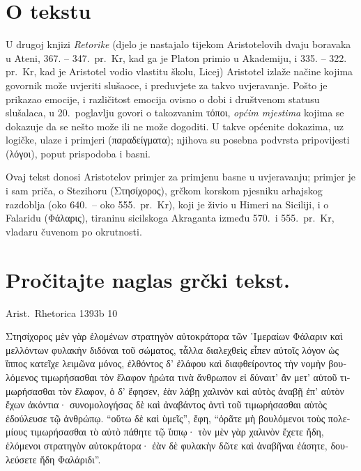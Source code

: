 


\section*{O tekstu}

U drugoj knjizi \textit{Retorike} (djelo je nastajalo tijekom Aristotelovih dvaju boravaka u Ateni, 367. – 347.\ pr.~Kr, kad ga je Platon primio u Akademiju, i 335. – 322. pr.~Kr, kad je Aristotel vodio vlastitu školu, Licej) Aristotel izlaže načine kojima govornik može uvjeriti slušaoce, i preduvjete za takvo uvjeravanje. Pošto je prikazao emocije, i različitost emocija ovisno o dobi i društvenom statusu slušalaca, u 20.\ poglavlju govori o takozvanim τόποι, \textit{općim mjestima} kojima se dokazuje da se nešto može ili ne može dogoditi. U takve općenite dokazima, uz logičke, ulaze i primjeri \textgreek[variant=ancient]{(παραδείγματα);} njihova su posebna podvrsta pripovijesti \textgreek[variant=ancient]{(λόγοι),} poput prispodoba i basni. 

Ovaj tekst donosi Aristotelov primjer za primjenu basne u uvjeravanju; primjer je i sam priča, o Stezihoru \textgreek[variant=ancient]{(Στησίχορος),} grčkom korskom pjesniku arhajskog razdoblja (oko 640.\ – oko 555.\ pr.~Kr), koji je živio u Himeri na Siciliji, i o Falaridu \textgreek[variant=ancient]{(Φάλαρις),} tiraninu sicilskoga Akraganta između 570.\ i 555.\ pr.~Kr, vladaru čuvenom po okrutnosti.

\newpage

\section*{Pročitajte naglas grčki tekst.}

Arist.\ Rhetorica 1393b 10

\medskip

{\large
\begin{greek}
\noindent Στησίχορος μὲν γὰρ ἑλομένων στρατηγὸν αὐτοκράτορα τῶν ῾Ιμεραίων Φάλαριν καὶ μελλόντων φυλακὴν διδόναι τοῦ σώματος, τἆλλα διαλεχθεὶς εἶπεν αὐτοῖς λόγον ὡς ἵππος κατεῖχε λειμῶνα μόνος, ἐλθόντος δ' ἐλάφου καὶ διαφθείροντος τὴν νομὴν βουλόμενος τιμωρήσασθαι τὸν ἔλαφον ἠρώτα τινὰ ἄνθρωπον εἰ δύναιτ' ἂν μετ' αὐτοῦ τιμωρήσασθαι τὸν ἔλαφον, ὁ δ' ἔφησεν, ἐὰν λάβῃ χαλινὸν καὶ αὐτὸς ἀναβῇ ἐπ' αὐτὸν ἔχων ἀκόντια· συνομολογήσας δὲ καὶ ἀναβάντος ἀντὶ τοῦ τιμωρήσασθαι αὐτὸς ἐδούλευσε τῷ ἀνθρώπῳ. ``οὕτω δὲ καὶ ὑμεῖς'', ἔφη, ``ὁρᾶτε μὴ βουλόμενοι τοὺς πολεμίους τιμωρήσασθαι τὸ αὐτὸ πάθητε τῷ ἵππῳ· τὸν μὲν γὰρ χαλινὸν ἔχετε ἤδη, ἑλόμενοι στρατηγὸν αὐτοκράτορα· ἐὰν δὲ φυλακὴν δῶτε καὶ ἀναβῆναι ἐάσητε, δουλεύσετε ἤδη Φαλάριδι''.

\end{greek}
}

